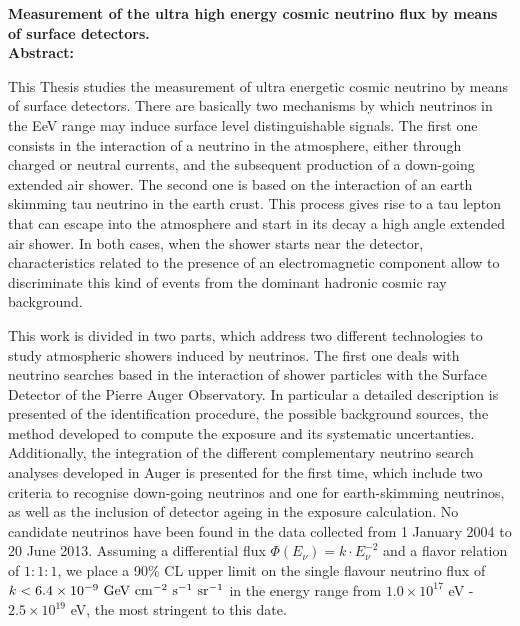 \begin{titlepage}

$\,$\\[2.5cm]
\textbf{\Large  Measurement of the ultra high energy cosmic neutrino flux by means of surface detectors.}\\[2.5cm]

\noindent
\textbf{Abstract: } 

This Thesis studies the measurement of ultra energetic cosmic neutrino by means of surface detectors. 
There are basically two mechanisms by which neutrinos in the EeV range may induce surface level distinguishable signals.
The first one consists in the interaction of a neutrino in the atmosphere, either through charged or neutral currents, and the subsequent production of a down-going extended air shower.
The second one is based on the interaction of an earth skimming tau neutrino in the earth crust.
This process gives rise to a tau lepton that can escape into the atmosphere and start in its decay a high angle extended air shower.
In both cases, when the shower starts near the detector, characteristics related to the presence of an electromagnetic component allow to discriminate this kind of events from the dominant hadronic cosmic ray background.

This work is divided in two parts, which address two different technologies to study atmospheric showers induced by neutrinos.
The first one deals with neutrino searches based in the interaction of shower particles with the Surface Detector of the Pierre Auger Observatory.
In particular a detailed description is presented of the identification procedure, the possible background sources, the method developed to compute the exposure and its systematic uncertanties.
Additionally, the integration of the different complementary neutrino search analyses developed in Auger is presented for the first time, which include two criteria to recognise down-going neutrinos and one for earth-skimming neutrinos, as well as the inclusion of detector ageing in the exposure calculation.
No candidate neutrinos have been found in the data collected from 1 January 2004 to 20 June 2013. 
Assuming a differential flux $\Phi(E_\nu) = k\cdot E_\nu^{-2}$ and a flavor relation of $1:1:1$, we place a 90\% CL upper limit on the single flavour neutrino flux of $k < 6.4 \times 10^{-9}~{\rm GeV~cm^{-2}~s^{-1}~sr^{-1}}$ in the energy range from ${1.0 \times 10^{17}}$ {eV} - ${2.5 \times 10^{19}}$ {eV}, the most stringent to this date.


\end{titlepage}
